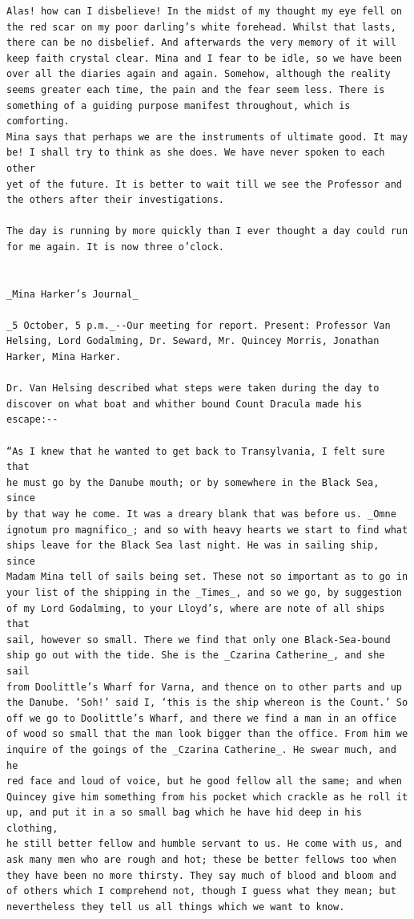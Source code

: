 \documentclass{article}
\begin{document}
\begin{verbatim}
Alas! how can I disbelieve! In the midst of my thought my eye fell on
the red scar on my poor darling’s white forehead. Whilst that lasts,
there can be no disbelief. And afterwards the very memory of it will
keep faith crystal clear. Mina and I fear to be idle, so we have been
over all the diaries again and again. Somehow, although the reality
seems greater each time, the pain and the fear seem less. There is
something of a guiding purpose manifest throughout, which is comforting.
Mina says that perhaps we are the instruments of ultimate good. It may
be! I shall try to think as she does. We have never spoken to each other
yet of the future. It is better to wait till we see the Professor and
the others after their investigations.

The day is running by more quickly than I ever thought a day could run
for me again. It is now three o’clock.


_Mina Harker’s Journal_

_5 October, 5 p.m._--Our meeting for report. Present: Professor Van
Helsing, Lord Godalming, Dr. Seward, Mr. Quincey Morris, Jonathan
Harker, Mina Harker.

Dr. Van Helsing described what steps were taken during the day to
discover on what boat and whither bound Count Dracula made his escape:--

“As I knew that he wanted to get back to Transylvania, I felt sure that
he must go by the Danube mouth; or by somewhere in the Black Sea, since
by that way he come. It was a dreary blank that was before us. _Omne
ignotum pro magnifico_; and so with heavy hearts we start to find what
ships leave for the Black Sea last night. He was in sailing ship, since
Madam Mina tell of sails being set. These not so important as to go in
your list of the shipping in the _Times_, and so we go, by suggestion
of my Lord Godalming, to your Lloyd’s, where are note of all ships that
sail, however so small. There we find that only one Black-Sea-bound
ship go out with the tide. She is the _Czarina Catherine_, and she sail
from Doolittle’s Wharf for Varna, and thence on to other parts and up
the Danube. ‘Soh!’ said I, ‘this is the ship whereon is the Count.’ So
off we go to Doolittle’s Wharf, and there we find a man in an office
of wood so small that the man look bigger than the office. From him we
inquire of the goings of the _Czarina Catherine_. He swear much, and he
red face and loud of voice, but he good fellow all the same; and when
Quincey give him something from his pocket which crackle as he roll it
up, and put it in a so small bag which he have hid deep in his clothing,
he still better fellow and humble servant to us. He come with us, and
ask many men who are rough and hot; these be better fellows too when
they have been no more thirsty. They say much of blood and bloom and
of others which I comprehend not, though I guess what they mean; but
nevertheless they tell us all things which we want to know.


\end{verbatim}
\end{document}

